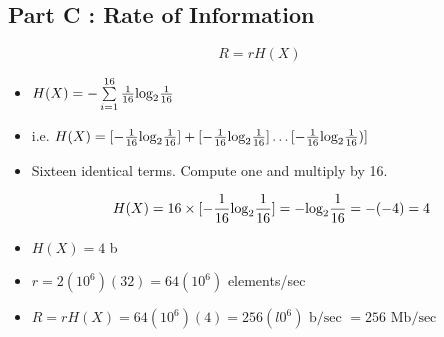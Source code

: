\documentclass[]{article}
\begin{document}
\subsection*{Part C : Rate of Information}
\[R = rH(X)\]
\begin{itemize}
\item $H(X) = - \sum \limits^{16}_{i=1} {1\over 16} \mbox{log}_2{1\over 16}$ \bigskip

\item i.e. $H(X) = [ -{1\over 16} \mbox{log}_2{1\over 16} ] + [- {1\over 16} \mbox{log}_2{1\over 16} ] \ldots [ -{1\over 16} \mbox{log}_2{1\over 16}) ] $ \bigskip
\item Sixteen identical terms. Compute one and multiply by 16.

\[ H(X) = 16 \times [ -{1\over 16} \mbox{log}_2{1\over 16} ]  = -\mbox{log}_2{1\over 16} = -(-4) = 4\] \bigskip
\item $H(X)= 4$ b
\item $r =  2(10^6)(32) = 64(10^6)$ elements/sec \bigskip

\item $R = rH(X) = 64(10^6)(4) = 256(l0^6) \mbox{ b/sec } = 256 \mbox{ Mb/sec }$ \bigskip
\end{itemize}
\end{document}
